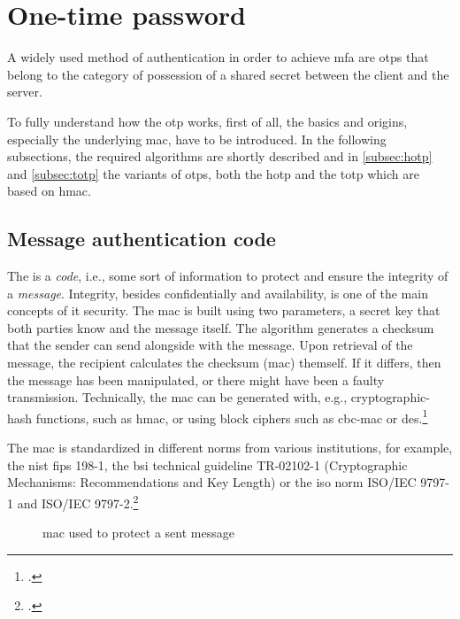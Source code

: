 \section{One-time password}

A widely used method of authentication in order to achieve \gls{mfa} are \glspl{otp} that belong to the category of possession of a shared secret between the client and the server.

To fully understand how the \gls{otp} works, first of all, the basics and origins, especially the underlying \gls{mac}, have to be introduced. In the following subsections, the required algorithms are shortly described and in \autoref{subsec:hotp} and \autoref{subsec:totp} the variants of \glspl{otp}, both the \gls{hotp} and the \gls{totp} which are based on \gls{hmac}.

\subsection{Message authentication code}

The  is a \textit{code}, i.e., some sort of information to protect and ensure the integrity of a \textit{message}. Integrity, besides confidentially and availability, is one of the main concepts of \gls{it} security. The \gls{mac} is built using two parameters, a secret key that both parties know and the message itself. The algorithm generates a checksum that the sender can send alongside with the message. Upon retrieval of the message, the recipient calculates the checksum (\gls{mac}) themself. If it differs, then the message has been manipulated, or there might have been a faulty transmission. Technically, the \gls{mac} can be generated with, e.g., cryptographic-hash functions, such as \gls{hmac}, or using block ciphers such as \gls{cbc-mac} or \gls{des}.\footcites[See][565]{320284}[See][163--168]{anderson2008security}[See][391--393]{eckert-it-sec-9}

The \gls{mac} is standardized in different norms from various institutions, for example, the \gls{nist} \gls{fips} 198-1, the \gls{bsi} technical guideline TR-02102-1 (\frqq Cryptographic Mechanisms: Recommendations and Key Length\flqq{}) or the \gls{iso} norm ISO/IEC 9797-1 and ISO/IEC 9797-2.\footcites[See][]{FIPS198}[See][]{bsi2019recommendations}[See][]{iso9797-1}[See][]{iso9797-2}
 
\begin{figure}[hbt]
	\centering
	
	\caption[\Glsdesc{mac} used to protect a sent message]{\Glsdesc{mac} used to protect a sent message\footnotemark}
	\label{fig:mac}
\end{figure}


